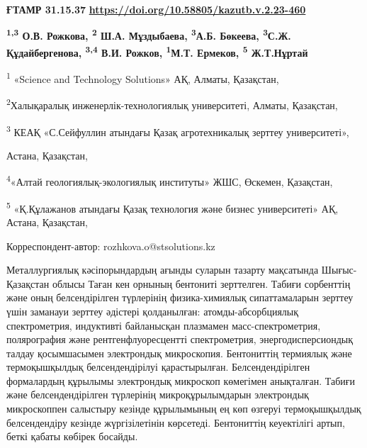 \newpage
{}
{\bfseries ҒТАМР 31.15.37}
\hfill {\bfseries \href{https://doi.org/10.58805/kazutb.v.2.23-460}{https://doi.org/10.58805/kazutb.v.2.23-460}}


\begin{center}
{\bfseries \textsuperscript{1,3} О.В. Рожкова\envelope, \textsuperscript{2} Ш.А. Мұздыбаева, \textsuperscript{3}А.Б. Бөкеева, \textsuperscript{3}С.Ж. Құдайбергенова, \textsuperscript{3,4} В.И. Рожков, \textsuperscript{1}М.Т. Ермеков, \textsuperscript{5} Ж.Т.Нұртай}

\textsuperscript{1} «Science and Technology Solutions» АҚ, Алматы,
Қазақстан,

\textsuperscript{2}Халықаралық инженерлік-технологиялық университеті,
Алматы, Қазақстан,

\textsuperscript{3} КЕАҚ «С.Сейфуллин атындағы Қазақ агротехникалық
зерттеу университеті»,

Астана, Қазақстан,

\textsuperscript{4}«Алтай геологиялық-экологиялық институты» ЖШС,
Өскемен, Қазақстан,

\textsuperscript{5} «Қ.Құлажанов атындағы Қазақ технология және бизнес
университеті» АҚ, Астана, Қазақстан,

\envelope Корреспондент-автор: rozhkova.o@stsolutions.kz
\end{center}

Металлургиялық кәсіпорындардың ағынды суларын тазарту мақсатында
Шығыс-Қазақстан облысы Таған кен орнының бентониті зерттелген. Табиғи
сорбенттің және оның белсендірілген түрлерінің физика-химиялық
сипаттамаларын зерттеу үшін заманауи зерттеу әдістері қолданылған:
атомды-абсорбциялық спектрометрия, индуктивті байланысқан плазмамен
масс-спектрометрия, полярография және рентгенфлуоресцентті
спектрометрия, энергодисперсиондық талдау қосымшасымен электрондық
микроскопия. Бентониттің термиялық және термоқышқылдық белсендендірілуі
қарастырылған. Белсендендірілген формалардың құрылымы электрондық
микроскоп көмегімен анықталған. Табиғи және белсендендірілген түрлерінің
микроқұрылымдарын электрондық микроскоппен салыстыру кезінде құрылымының
ең көп өзгеруі термоқышқылдық белсендендіру кезінде жүргізілетінін
көрсетеді. Бентониттің кеуектілігі артып, беткі қабаты көбірек босайды.


